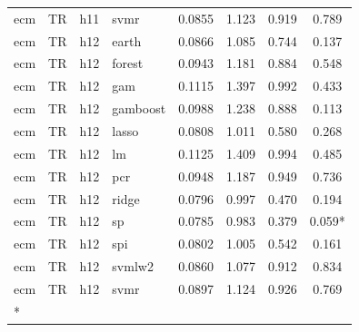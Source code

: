 \begin{ThreePartTable}
\begin{longtable}[t]{llclcccc}
ecm & TR & h11 & svmr & 0.0855 & 1.123 & 0.919 & 0.789\\
\addlinespace
ecm & TR & h12 & earth & 0.0866 & 1.085 & 0.744 & 0.137\\
ecm & TR & h12 & forest & 0.0943 & 1.181 & 0.884 & 0.548\\
ecm & TR & h12 & gam & 0.1115 & 1.397 & 0.992 & 0.433\\
ecm & TR & h12 & gamboost & 0.0988 & 1.238 & 0.888 & 0.113\\
ecm & TR & h12 & lasso & 0.0808 & 1.011 & 0.580 & 0.268\\
ecm & TR & h12 & lm & 0.1125 & 1.409 & 0.994 & 0.485\\
ecm & TR & h12 & pcr & 0.0948 & 1.187 & 0.949 & 0.736\\
ecm & TR & h12 & ridge & 0.0796 & 0.997 & 0.470 & 0.194\\
ecm & TR & h12 & sp & 0.0785 & 0.983 & 0.379 & 0.059*\\
ecm & TR & h12 & spi & 0.0802 & 1.005 & 0.542 & 0.161\\
ecm & TR & h12 & svmlw2 & 0.0860 & 1.077 & 0.912 & 0.834\\
ecm & TR & h12 & svmr & 0.0897 & 1.124 & 0.926 & 0.769\\*
\end{longtable}
\end{ThreePartTable}
\endgroup{}
